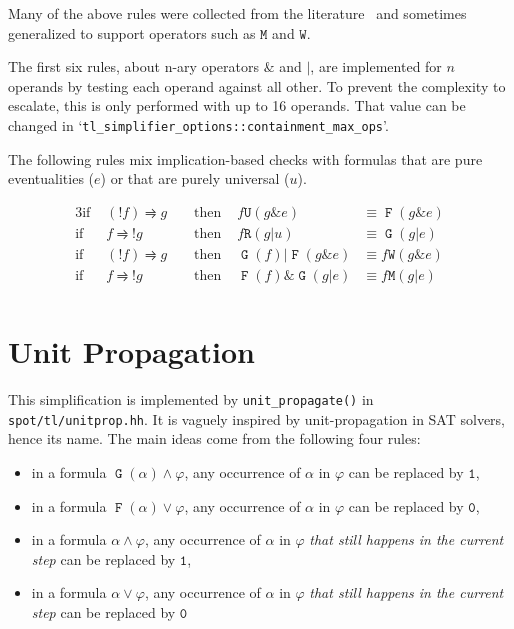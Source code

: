 \documentclass[a4paper,twoside,10pt,DIV=12]{scrreprt}
\DeclareMathOperator{\F}{\texttt{F}}
\DeclareMathOperator{\G}{\texttt{G}}
\newcommand{\U}{\mathbin{\texttt{U}}}
\newcommand{\R}{\mathbin{\texttt{R}}}
\newcommand{\M}{\mathbin{\texttt{M}}}
\newcommand{\W}{\mathbin{\texttt{W}}}
\DeclareMathOperator{\NOT}{\texttt{!}}
\newcommand{\OR}{\mathbin{\texttt{|}}}
\newcommand{\AND}{\mathbin{\texttt{\&}}}
\newcommand{\0}{\texttt{0}}
\newcommand{\1}{\texttt{1}}
\def\simp{\rightrightharpoons}
\begin{document}
Many of the above rules were collected from the
literature~\cite{somenzi.00.cav,tauriainen.03.tr,babiak.12.tacas} and
sometimes generalized to support operators such as $\M$ and $\W$.

The first six rules, about n-ary operators $\AND$ and $\OR$, are
implemented for $n$ operands by testing each operand against all
other.  To prevent the complexity to escalate, this is only performed
with up to 16 operands.  That value can be changed in
`\verb|tl_simplifier_options::containment_max_ops|'.

The following rules mix implication-based checks with formulas that
are pure eventualities ($e$) or that are purely universal ($u$).

\allowdisplaybreaks
\begin{alignat*}{3}
\text{if~} & (\NOT f)\simp g  &  & \text{~then~} & f \U (g \AND e)        & \equiv \F(g \AND e)    \\
\text{if~} & f\simp \NOT g    &  & \text{~then~} & f \R (g \OR u)         & \equiv \G(g \OR e)     \\
\text{if~} & (\NOT f) \simp g &  & \text{~then~} & \G(f) \OR \F(g \AND e) & \equiv f \W (g \AND e) \\
\text{if~} & f \simp\NOT g    &  & \text{~then~} & \F(f) \AND \G(g \OR e) & \equiv f \M (g \OR e)  \\
\end{alignat*}


\section{Unit Propagation}\label{sec:unitprop}

This simplification is implemented by \texttt{unit\_propagate()} in
\texttt{spot/tl/unitprop.hh}.  It is vaguely inspired by
unit-propagation in SAT solvers, hence its name.   The main
ideas come from the following four rules:
\begin{itemize}
\item in a formula $\G(\alpha)\land \varphi$, any occurrence of
      $\alpha$ in $\varphi$ can be replaced by $\1$,
\item in a formula $\F(\alpha)\lor \varphi$, any occurrence of
      $\alpha$ in $\varphi$ can be replaced by $\0$,
\item in a formula $\alpha\land \varphi$, any occurrence of
      $\alpha$ in $\varphi$ \emph{that still happens in the current step} can be replaced by $\1$,
\item in a formula $\alpha\lor \varphi$, any occurrence of
  $\alpha$ in $\varphi$ \emph{that still happens in the current step} can be replaced by $\0$
\end{itemize}
\end{document}
